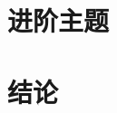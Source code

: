 \documentclass[oneside]{book}
\theoremstyle{definition}
\begin{document}
\part{进阶主题}







\part{结论}







%
%
%
\end{document}
